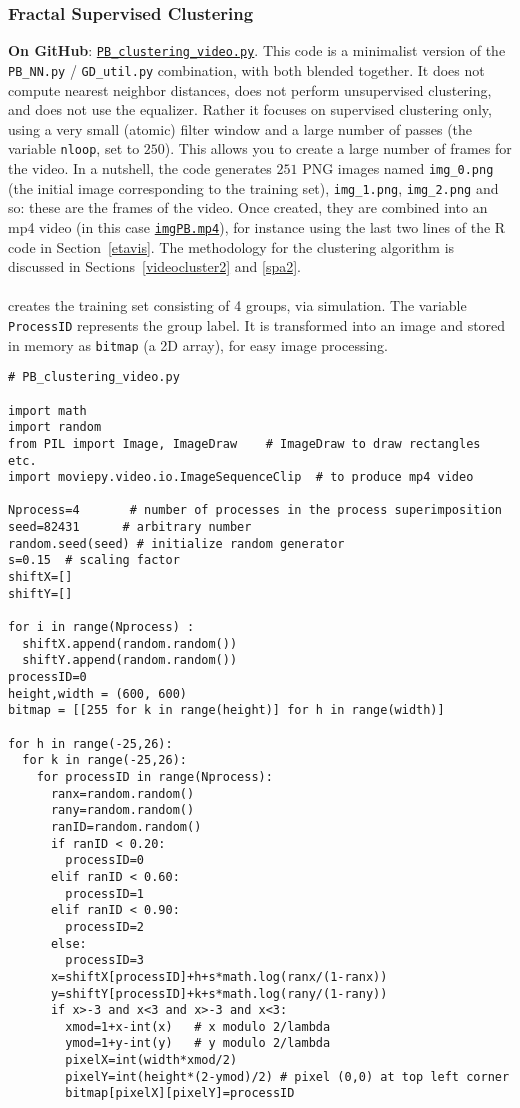 \documentclass[10pt]{article}
\begin{document}
\subsubsection{Fractal Supervised Clustering}\label{codefr} 
{\bf On GitHub}: \href{https://github.com/VincentGranville/Point-Processes/blob/main/Videos/PB_clustering_video.py}{\texttt{PB\_clustering\_video.py}}. This code is a minimalist version of the \texttt{PB\_NN.py} / \texttt{GD\_util.py} combination, with both blended together. It does not compute nearest neighbor distances, does not
perform unsupervised clustering, and does not use the equalizer. Rather it focuses on supervised clustering only, using a very small (atomic) filter window and a large number of passes (the variable \texttt{nloop}, set to $250$). This
allows you to create a large number of frames for the video. In a nutshell, the code generates $251$ PNG images named 
\texttt{img\_0.png} (the initial image corresponding to the training set), \texttt{img\_1.png}, \texttt{img\_2.png} and so: these are the frames of the video. 
 Once created, they are combined into an mp4 video
(in this case \href{https://www.youtube.com/watch?v=dNPSEh-X6uw}{\texttt{imgPB.mp4}}), for instance using the last two lines of the R code in Section~\ref{etavis}. The methodology for the clustering algorithm is discussed in Sections~\ref{videocluster2} and \ref{spa2}.\\
\quad \\
 creates the training set consisting of 4 groups, via simulation. The variable \texttt{ProcessID} represents the group label. It is transformed into an image and stored in memory as \texttt{bitmap} (a 2D array), for easy image processing.
\begin{lstlisting}
# PB_clustering_video.py

import math
import random
from PIL import Image, ImageDraw    # ImageDraw to draw rectangles etc.
import moviepy.video.io.ImageSequenceClip  # to produce mp4 video

Nprocess=4       # number of processes in the process superimposition
seed=82431      # arbitrary number
random.seed(seed) # initialize random generator 
s=0.15  # scaling factor
shiftX=[]
shiftY=[]

for i in range(Nprocess) :
  shiftX.append(random.random())
  shiftY.append(random.random())
processID=0
height,width = (600, 600)
bitmap = [[255 for k in range(height)] for h in range(width)]

for h in range(-25,26):   
  for k in range(-25,26):  
    for processID in range(Nprocess): 
      ranx=random.random()
      rany=random.random()
      ranID=random.random()
      if ranID < 0.20:
        processID=0
      elif ranID < 0.60:
        processID=1
      elif ranID < 0.90:
        processID=2 
      else:
        processID=3
      x=shiftX[processID]+h+s*math.log(ranx/(1-ranx)) 
      y=shiftY[processID]+k+s*math.log(rany/(1-rany))
      if x>-3 and x<3 and x>-3 and x<3:
        xmod=1+x-int(x)   # x modulo 2/lambda
        ymod=1+y-int(y)   # y modulo 2/lambda
        pixelX=int(width*xmod/2)   
        pixelY=int(height*(2-ymod)/2) # pixel (0,0) at top left corner
        bitmap[pixelX][pixelY]=processID
\end{lstlisting}
\end{document}
